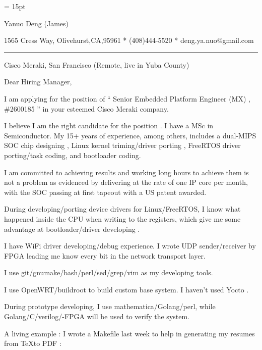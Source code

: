 

  \FFrg \baselineskip = 15pt

{
Yanuo Deng (James)
}

{ 
1565 Cress Way, Olivehurst,CA,95961
*
(408)444-5520
*
deng.ya.nuo@gmail.com
}

{ \smallbreak } 

{\par\noindent\hrule} 

{ \bigbreak } 


Cisco Meraki, San Francisco (Remote, live in Yuba County)

{ 
Dear Hiring Manager,
}

{ \bigbreak } 
I am applying for the position of `` Senior Embedded Platform Engineer (MX) , \#2600185 '' in your esteemed Cisco Meraki company.

{ \bigbreak } 
I believe I am the right candidate for the position .
I have a MSc in Semiconductor.
My 15+ years of experience, among others, 
includes a dual-MIPS SOC chip designing ,
Linux kernel triming/driver porting , 
FreeRTOS driver porting/task coding,
and bootloader coding.

{ \bigbreak } 
I am committed to achieving results and working long hours 
to achieve them is not a problem as evidenced by 
delivering at the rate of one IP core per month,
with the SOC passing at first tapeout
with a US patent awarded.

{ \bigbreak } 
During developing/porting device drivers for Linux/FreeRTOS,
I know what happened inside the CPU when writing to the registers,
which give me some advantage at bootloader/driver developing .

{ \bigbreak } 
I have WiFi driver developing/debug experience. 
I wrote UDP sender/receiver by FPGA leading me know every bit in the network transport layer.

{ \bigbreak } 
I use git/gnumake/bash/perl/sed/grep/vim as my developing tools.

{ \bigbreak } 
I use OpenWRT/buildroot to build custom base system. I haven't used Yocto .

{ \bigbreak } 
During prototype developing, I use mathematica/Golang/perl, 
while Golang/C/verilog/-FPGA will be used to verify the system.

{ \bigbreak } 
A living example : I wrote a Makefile last week to help in generating my resumes from \TeX to PDF : 

